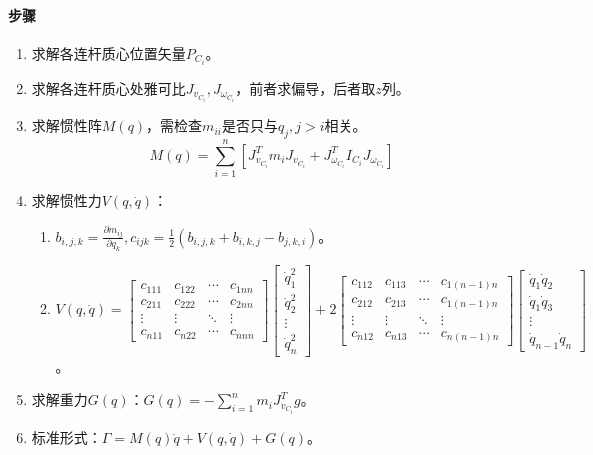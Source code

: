 \documentclass[
12pt, %
a4paper, 
oneside, %
headinclude,footinclude, %
]{scrartcl}
\begin{document}
\paragraph{步骤}
\begin{enumerate}
\item 求解各连杆质心位置矢量$ P_{C_i} $。
\item 求解各连杆质心处雅可比$ J_{v_{C_i}}, J_{\omega_{C_i}} $，前者求偏导，后者取$ z $列。
\item 求解惯性阵$ M(q) $，需检查$ m_{ii} $是否只与$ q_j, j > i $相关。
$$ M(q) = \sum_{i = 1}^{n}[J_{v_{C_i}}^T m_i J_{v_{C_i}} + J_{\omega_{C_i}}^T I_{C_i} J_{\omega_{C_i}}] $$
\item 求解惯性力$ V(q, \dot{q}) $：
\begin{enumerate}
\item $ b_{i,j,k} = \frac{\partial m_{ij}}{\partial q_k}, c_{ijk} = \frac{1}{2}(b_{i,j,k} + b_{i,k,j} - b_{j,k,i}) $。
\item 
$
V(q, \dot{q}) = 
\begin{bmatrix} c_{111} & c_{122} & \cdots & c_{1nn} \\ c_{211} & c_{222} & \cdots & c_{2nn} \\ \vdots & \vdots & \ddots & \vdots \\ c_{n11} & c_{n22} & \cdots & c_{nnn} \end{bmatrix} \begin{bmatrix} \dot{q}_1^2 \\ \dot{q}_2^2 \\ \vdots \\ \dot{q}_n^2 \end{bmatrix}
+ 2\begin{bmatrix} c_{112} & c_{113} & \cdots & c_{1(n - 1)n} \\ c_{212} & c_{213} & \cdots & c_{1(n - 1)n} \\ \vdots & \vdots & \ddots & \vdots \\ c_{n12} & c_{n13} & \cdots & c_{n(n - 1)n} \end{bmatrix} \begin{bmatrix} \dot{q}_1 \dot{q}_2 \\ \dot{q}_1 \dot{q}_3 \\ \vdots \\ \dot{q}_{n - 1} \dot{q}_n \end{bmatrix}
$。
\end{enumerate}
\item 求解重力$ G(q) $：$ G(q) = -\sum_{i = 1}^{n} m_i J_{v_{C_i}}^T g $。
\item 标准形式：$ \Gamma = M(q) \ddot{q} + V(q, \dot{q}) + G(q) $。
\end{enumerate}
\end{document}
